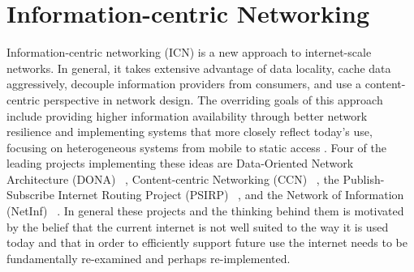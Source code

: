 \section{Information-centric Networking}
\label{section:information-centric-networking}
Information-centric networking (ICN) is a new approach to internet-scale networks.  In general, it takes extensive advantage of data locality, cache data aggressively, decouple information providers from consumers, and use a content-centric perspective in network design. The overriding goals of this approach include providing higher information availability through better network resilience and implementing systems that more closely reflect today's use, focusing on heterogeneous systems from mobile to static access \cite{6231276}.  Four of the leading projects implementing these ideas are Data-Oriented Network Architecture (DONA) ~\cite{Koponen:2007:DNA:1282427.1282402}, Content-centric Networking (CCN) ~\cite{NDN,CCNx}, the Publish-Subscribe Internet Routing Project (PSIRP) ~\cite{PSIRP}, and the Network of Information (NetInf) ~\cite{NetInf}.  In general these projects and the thinking behind them is motivated by the belief that the current internet is not well suited to the way it is used today and that in order to efficiently support future use the internet needs to be fundamentally re-examined and perhaps re-implemented.

